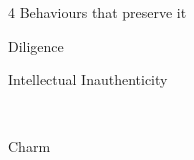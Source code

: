 \documentclass[aspectratio=169]{beamer}
\begin{document}
\begin{frame}
  \begin{center}
    \Huge 4 Behaviours that preserve it
  \end{center}
\end{frame}

\begin{frame}
  \begin{center}
    \Huge Diligence
    \\ \small \cite{clanceimes78}

  \end{center}
\end{frame}

\begin{frame}
  \begin{center}
    \Huge Intellectual Inauthenticity

    \\ \small \cite{clanceimes78}
  \end{center}
\end{frame}

\begin{frame}
  \begin{center}
    \Huge Charm

    \\ \small \cite{clanceimes78}
  \end{center}
\end{frame}
\end{document}
